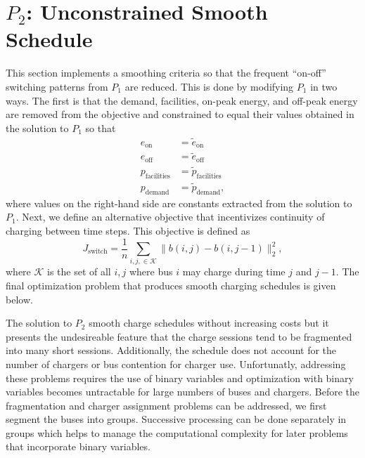 \section{$P_2$: Unconstrained Smooth Schedule \label{sec:unconstrainedSmoothSchedule}} 
\par This section implements a smoothing criteria so that the frequent ``on-off'' switching patterns from $P_1$ are reduced. This is done by modifying $P_1$ in two ways. The first is that the demand, facilities, on-peak energy, and off-peak energy are removed from the objective and constrained to equal their values obtained in the solution to $P_1$ so that
\begin{equation}\label{eqn:unconstrainedSmooth:equivalence}\begin{aligned}
	e_{\text{on}} &= \tilde{e}_{\text{on}} \\
	e_{\text{off}} &= \tilde{e}_{\text{off}} \\
	p_{\text{facilities}} &= \tilde{p}_{\text{facilities}} \\
	p_{\text{demand}} &= \tilde{p}_{\text{demand}},
\end{aligned}\end{equation}
where values on the right-hand side are constants extracted from the solution to $P_1$.
Next, we define an alternative objective that incentivizes continuity of charging between time steps. This objective is defined as
\begin{equation}\label{eqn:objective:smooth}
	J_{\text{switch}} = \frac{1}{n}\sum_{i,j, \in \mathcal{K}}\lVert b(i,j) - b(i,j-1) \rVert^2_2,
\end{equation}
where $\mathcal{K}$ is the set of all $i,j$ where bus $i$ may charge during time $j$ and $j - 1$.  The final optimization problem that produces smooth charging schedules is given below.\\[0.1in]
\par The solution to $P_2$ smooth charge schedules without increasing costs but it presents the undesireable feature that the charge sessions tend to be fragmented into many short sessions. Additionally, the schedule does not account for the number of chargers or bus contention for charger use. Unfortunatly, addressing these problems requires the use of binary variables and optimization with binary variables becomes untractable for large numbers of buses and chargers. Before the fragmentation and charger assignment problems can be addressed, we first segment the buses into groups.  Successive processing can be done separately in groups which helps to manage the computational complexity for later problems that incorporate binary variables.
